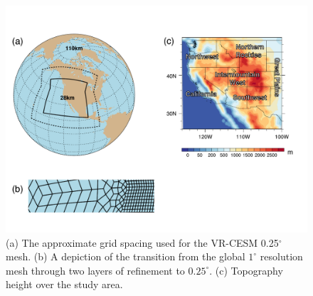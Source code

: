 \documentclass{ametsoc}
\begin{document}
\clearpage


\begin{figure}
\begin{center}
\includegraphics[width=5in]{gridmesh_mod.pdf}
\caption{(a) The approximate grid spacing used for the VR-CESM 0.25$^\circ$ mesh. (b) A depiction of the transition from the global $1^\circ$ resolution mesh through two layers of refinement to $0.25^\circ$. (c) Topography height over the study area.}
\label{fig:gridmesh}
\end{center}
\end{figure}  
\end{document}
